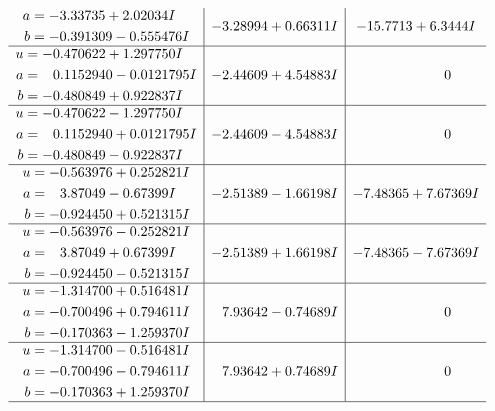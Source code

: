 \documentclass[1p]{elsarticle_modified}
\theoremstyle{definition}
\begin{document}
$$\begin{array}{c|c|c}
\begin{aligned}
a &= -3.33735 + 2.02034 I \\
b &= -0.391309 - 0.555476 I\end{aligned}
 & -3.28994 + 0.66311 I & -15.7713 + 6.3444 I \\ \hline\begin{aligned}
u &= -0.470622 + 1.297750 I \\
a &= \phantom{-}0.1152940 - 0.0121795 I \\
b &= -0.480849 + 0.922837 I\end{aligned}
 & -2.44609 + 4.54883 I & \phantom{-0.000000 } 0 \\ \hline\begin{aligned}
u &= -0.470622 - 1.297750 I \\
a &= \phantom{-}0.1152940 + 0.0121795 I \\
b &= -0.480849 - 0.922837 I\end{aligned}
 & -2.44609 - 4.54883 I & \phantom{-0.000000 } 0 \\ \hline\begin{aligned}
u &= -0.563976 + 0.252821 I \\
a &= \phantom{-}3.87049 - 0.67399 I \\
b &= -0.924450 + 0.521315 I\end{aligned}
 & -2.51389 - 1.66198 I & -7.48365 + 7.67369 I \\ \hline\begin{aligned}
u &= -0.563976 - 0.252821 I \\
a &= \phantom{-}3.87049 + 0.67399 I \\
b &= -0.924450 - 0.521315 I\end{aligned}
 & -2.51389 + 1.66198 I & -7.48365 - 7.67369 I \\ \hline\begin{aligned}
u &= -1.314700 + 0.516481 I \\
a &= -0.700496 + 0.794611 I \\
b &= -0.170363 - 1.259370 I\end{aligned}
 & \phantom{-}7.93642 - 0.74689 I & \phantom{-0.000000 } 0 \\ \hline\begin{aligned}
u &= -1.314700 - 0.516481 I \\
a &= -0.700496 - 0.794611 I \\
b &= -0.170363 + 1.259370 I\end{aligned}
 & \phantom{-}7.93642 + 0.74689 I & \phantom{-0.000000 } 0\\
 \hline 
 \end{array}$$\newpage$$\begin{array}{c|c|c}  

\end{array}$$
\end{document}
